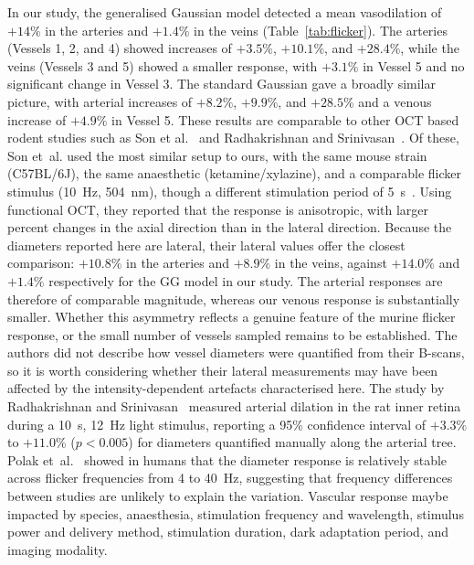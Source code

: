 \documentclass{optica-article}
\begin{document}
In our study, the generalised Gaussian model detected a mean vasodilation of $+14\%$ in the arteries and $+1.4\%$ in the veins (Table~\ref{tab:flicker}). The arteries (Vessels 1, 2, and 4) showed increases of $+3.5\%$, $+10.1\%$, and $+28.4\%$, while the veins (Vessels 3 and 5) showed a smaller response, with $+3.1\%$ in Vessel 5 and no significant change in Vessel 3. The standard Gaussian gave a broadly similar picture, with arterial increases of $+8.2\%$, $+9.9\%$, and $+28.5\%$ and a venous increase of $+4.9\%$ in Vessel 5. These results are comparable to other OCT based rodent studies such as Son et al.~\cite{sonFunctionalOCTReveals2024} and Radhakrishnan and Srinivasan~\cite{radhakrishnanMultiparametricOpticalCoherence2013}. Of these, Son et~al. used the most similar setup to ours, with the same mouse strain (C57BL/6J), the same anaesthetic (ketamine/xylazine), and a comparable flicker stimulus (10~Hz, 504~nm), though a different stimulation period of 5~s~\cite{sonFunctionalOCTReveals2024}. Using functional OCT, they reported that the response is anisotropic, with larger percent changes in the axial direction than in the lateral direction. Because the diameters reported here are lateral, their lateral values offer the closest comparison: $+10.8\%$ in the arteries and $+8.9\%$ in the veins, against $+14.0\%$ and $+1.4\%$ respectively for the GG model in our study. The arterial responses are therefore of comparable magnitude, whereas our venous response is substantially smaller. Whether this asymmetry reflects a genuine feature of the murine flicker response, or the small number of vessels sampled remains to be established. The authors did not describe how vessel diameters were quantified from their B-scans, so it is worth considering whether their lateral measurements may have been affected by the intensity-dependent artefacts characterised here. The study by Radhakrishnan and Srinivasan~\cite{radhakrishnanMultiparametricOpticalCoherence2013} measured arterial dilation in the rat inner retina during a 10~s, 12~Hz light stimulus, reporting a 95\% confidence interval of $+3.3\%$ to $+11.0\%$ ($p < 0.005$) for diameters quantified manually along the arterial tree. Polak et~al.~\cite{polakInfluenceFlickerFrequency2002} showed in humans that the diameter response is relatively stable across flicker frequencies from 4 to 40~Hz, suggesting that frequency differences between studies are unlikely to explain the variation. Vascular response maybe impacted by species, anaesthesia, stimulation frequency and wavelength, stimulus power and delivery method, stimulation duration, dark adaptation period, and imaging modality. 
\end{document}
